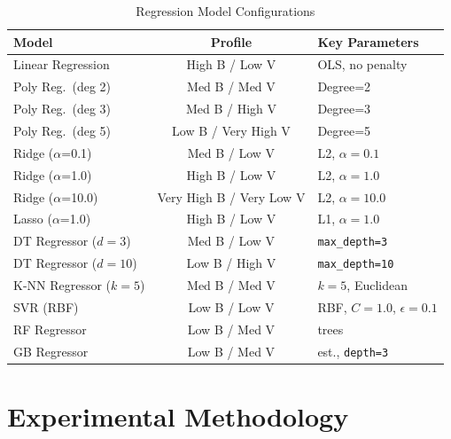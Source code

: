 \documentclass[conference]{IEEEtran}
\begin{document}
\begin{table}[t]
    \caption{Regression Model Configurations}
    \label{tab:regressors}
    \centering
    \small
    \renewcommand{\arraystretch}{1.3}
    \begin{tabular}{|>{\raggedright\arraybackslash}p{1.3in}|c|>{\raggedright\arraybackslash}p{1.1in}|}
    \hline
    \textbf{Model} & \textbf{Profile} & \textbf{Key Parameters} \\
    \hline
    Linear Regression       & High B / Low V   & OLS, no penalty \\
    \hline
    Poly Reg.\ (deg 2)      & Med B / Med V    & Degree=2 \\
    \hline
    Poly Reg.\ (deg 3)      & Med B / High V   & Degree=3 \\
    \hline
    Poly Reg.\ (deg 5)      & Low B / Very High V & Degree=5 \\
    \hline
    Ridge ($\alpha$=0.1)    & Med B / Low V    & L2, $\alpha=0.1$ \\
    \hline
    Ridge ($\alpha$=1.0)    & High B / Low V   & L2, $\alpha=1.0$ \\
    \hline
    Ridge ($\alpha$=10.0)   & Very High B / Very Low V & L2, $\alpha=10.0$ \\
    \hline
    Lasso ($\alpha$=1.0)    & High B / Low V   & L1, $\alpha=1.0$ \\
    \hline
    DT Regressor ($d=3$)    & Med B / Low V    & \texttt{max\_depth=3} \\
    \hline
    DT Regressor ($d=10$)   & Low B / High V   & \texttt{max\_depth=10} \\
    \hline
    K-NN Regressor ($k=5$)  & Med B / Med V    & $k=5$, Euclidean \\
    \hline
    SVR (RBF)               & Low B / Low V    & RBF, $C=1.0$, $\epsilon=0.1$ \\
    \hline
    RF Regressor            & Low B / Med V    & 100 trees \\
    \hline
    GB Regressor            & Low B / Med V    & 100 est., \texttt{depth=3} \\
    \hline
    \end{tabular}
\end{table}

\section{Experimental Methodology}
\end{document}
